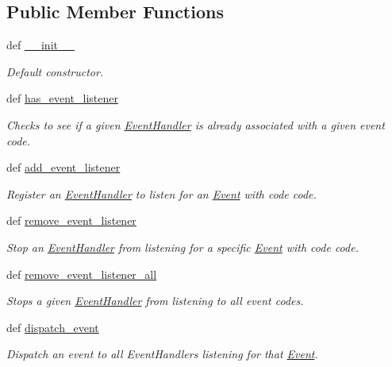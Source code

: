\subsection*{Public Member Functions}
\begin{DoxyCompactItemize}
\item 
\hypertarget{class_event_dispatcher_1_1_event_dispatcher_abeca2b40e540e444eb96a233a9c697d9}{def \hyperlink{class_event_dispatcher_1_1_event_dispatcher_abeca2b40e540e444eb96a233a9c697d9}{\-\_\-\-\_\-init\-\_\-\-\_\-}}\label{class_event_dispatcher_1_1_event_dispatcher_abeca2b40e540e444eb96a233a9c697d9}

\begin{DoxyCompactList}\small\item\em Default constructor. \end{DoxyCompactList}\item 
def \hyperlink{class_event_dispatcher_1_1_event_dispatcher_accf2a074566d17035a7505fbd428dc29}{has\-\_\-event\-\_\-listener}
\begin{DoxyCompactList}\small\item\em Checks to see if a given \hyperlink{class_event_dispatcher_1_1_event_handler}{Event\-Handler} is already associated with a given event code. \end{DoxyCompactList}\item 
def \hyperlink{class_event_dispatcher_1_1_event_dispatcher_ae1fe43c67bf61743f8689fc13354fe22}{add\-\_\-event\-\_\-listener}
\begin{DoxyCompactList}\small\item\em Register an \hyperlink{class_event_dispatcher_1_1_event_handler}{Event\-Handler} to listen for an \hyperlink{class_event_dispatcher_1_1_event}{Event} with code code. \end{DoxyCompactList}\item 
def \hyperlink{class_event_dispatcher_1_1_event_dispatcher_abc78a2a5438b435e11a3f11f51aeabf5}{remove\-\_\-event\-\_\-listener}
\begin{DoxyCompactList}\small\item\em Stop an \hyperlink{class_event_dispatcher_1_1_event_handler}{Event\-Handler} from listening for a specific \hyperlink{class_event_dispatcher_1_1_event}{Event} with code code. \end{DoxyCompactList}\item 
def \hyperlink{class_event_dispatcher_1_1_event_dispatcher_a79463708a50cf97ca6ef39c8004d5550}{remove\-\_\-event\-\_\-listener\-\_\-all}
\begin{DoxyCompactList}\small\item\em Stops a given \hyperlink{class_event_dispatcher_1_1_event_handler}{Event\-Handler} from listening to all event codes. \end{DoxyCompactList}\item 
def \hyperlink{class_event_dispatcher_1_1_event_dispatcher_af7ba3f3cb530002c126735f2b76ab05f}{dispatch\-\_\-event}
\begin{DoxyCompactList}\small\item\em Dispatch an event to all Event\-Handlers listening for that \hyperlink{class_event_dispatcher_1_1_event}{Event}. \end{DoxyCompactList}\end{DoxyCompactItemize}
